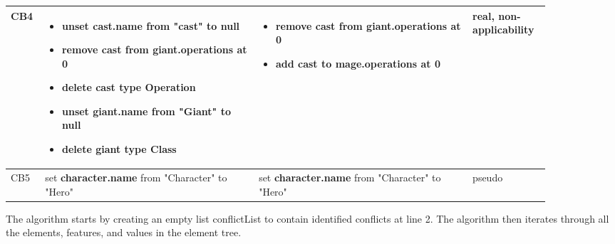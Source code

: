 \begin{table*}[ht]
\begin{scriptsize}
\begin{tabular}{|p{0.04\linewidth}|p{0.365\linewidth}|p{0.365\linewidth}|
      p{0.11\linewidth}|}
    \hline
    CB4 & 
    \begin{minipage}[t]{\linewidth}
      \raggedright
      \begin{itemize}[leftmargin=0pt]
        \setlength
        \item[] unset cast.name from "cast" to null
        \item[] remove cast from giant.operations at 0
        \item[] delete \textbf{cast} type Operation
        \item[] unset giant.name from "Giant" to null
        \item[] delete giant type Class
      \end{itemize}
    \end{minipage}
    & 
    \begin{minipage}[t]{\linewidth}
      \raggedright
      \begin{itemize}[leftmargin=0pt]
        \setlength
        \item[] remove \textbf{cast} from giant.operations at 0
        \item[] add \textbf{cast} to mage.operations at 0
      \end{itemize}
    \end{minipage}
    & 
    real, non-applicability\\
    \hline
    CB5 & 
    set \textbf{character.name} from "Character" to "Hero" & 
    set \textbf{character.name} from "Character" to "Hero" & 
    pseudo\\ 
    \hline
  \end{tabular}
\end{scriptsize}
\end{table*}

The algorithm starts by creating an empty list \textsf{conflictList} to contain identified conflicts at line 2. The algorithm then iterates through all the elements, features, and values in the element tree. 

